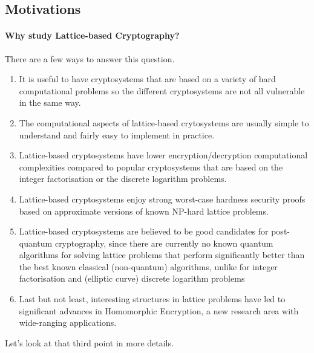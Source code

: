 \documentclass[../main.tex]{subfiles}
\begin{document}
\subsection{Motivations}
\paragraph{Why study Lattice-based Cryptography?}
There are a few ways to answer this question.
\begin{enumerate}\itemsep1mm\parskip0mm
 \item It is useful to have cryptosystems that are based on a variety of hard computational problems so the different cryptosystems are not all vulnerable in the same way. 
 \item The computational aspects of lattice-based crytosystems are usually simple to understand and fairly easy to implement in practice.
 \item Lattice-based cryptosystems have lower encryption/decryption computational complexities compared to popular cryptosystems that are based on the integer factorisation or the discrete logarithm problems. 
 \item Lattice-based cryptosystems enjoy strong worst-case hardness security proofs based on approximate versions of known NP-hard lattice problems. %
 \item Lattice-based cryptosystems are believed to be good candidates for post-quantum cryptography, since there are currently no known quantum algorithms for solving lattice problems that perform significantly better than the best known classical (non-quantum) algorithms, unlike for integer factorisation and (elliptic curve) discrete logarithm problems
 \item Last but not least, interesting structures in lattice problems have led to significant advances in Homomorphic Encryption, a new research area with wide-ranging applications.
\end{enumerate}

Let’s look at that third point in more details.
\end{document}
